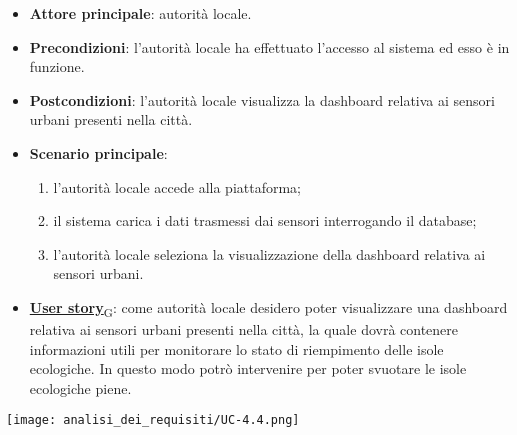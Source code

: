\begin{itemize}
	\item \textbf{Attore principale}: autorità locale.
	\item \textbf{Precondizioni}: l'autorità locale ha effettuato l'accesso al sistema ed esso è in funzione.
	\item \textbf{Postcondizioni}: l'autorità locale visualizza la dashboard relativa
	      ai sensori urbani presenti nella città.
	\item \textbf{Scenario principale}:
	      \begin{enumerate}
		      \item l'autorità locale accede alla piattaforma;
		      \item il sistema carica i dati trasmessi dai sensori interrogando il database;
		      \item l'autorità locale seleziona la visualizzazione della dashboard relativa ai sensori urbani.
	      \end{enumerate}
	\item \href{https://7last.github.io/docs/pb/documentazione-interna/glossario\#user-story}{\textbf{User story}\textsubscript{G}}:
	      come autorità locale desidero poter visualizzare una dashboard relativa ai sensori urbani presenti nella città, la quale
	      dovrà contenere informazioni utili per monitorare lo stato di riempimento delle isole ecologiche. In questo modo potrò intervenire
	      per poter svuotare le isole ecologiche piene.
\end{itemize}
\begin{center}
	\texttt{[image: analisi\_dei\_requisiti/UC-4.4.png]}
\end{center}


